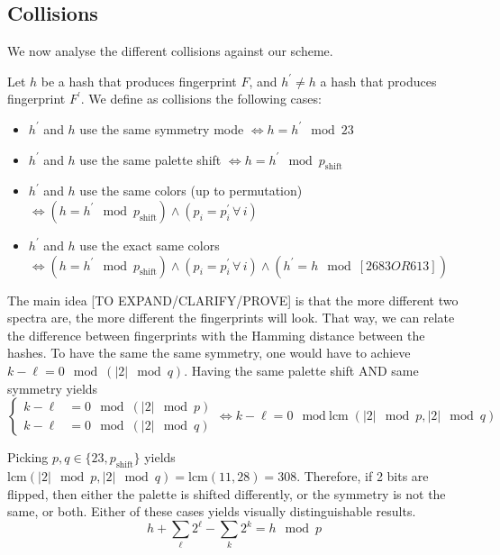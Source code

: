 \documentclass{article}
\begin{document}
\subsection{Collisions}
\newcommand{\foralls}{\hspace{2pt}\forall\hspace{2pt}}
We now analyse the different collisions against our scheme. 

Let $h$ be a hash that produces fingerprint $F$, and $h^\prime \neq h$ a hash that produces fingerprint $F^\prime$. We define as collisions the following cases:
\begin{itemize}
	\item $h^\prime$ and $h$ use the same symmetry mode $\iff h = h^\prime \mod 23$
	\item $h^\prime$ and $h$ use the same palette shift $\iff h = h^\prime \mod p_{\text{shift}}$
	\item $h^\prime$ and $h$ use the same colors (up to permutation) $\iff (h = h^\prime \mod p_{\text{shift}}) \wedge (p_i = p^\prime_i \foralls i)$
	\item $h^\prime$ and $h$ use the exact same colors $\iff (h = h^\prime \mod p_{\text{shift}}) \wedge (p_i = p^\prime_i \foralls i) \wedge (h^\prime = h \mod [2683 OR 613])$
\end{itemize}

The main idea [TO EXPAND/CLARIFY/PROVE] is that the more different two spectra are, the more different the fingerprints will look. That way, we can relate the difference between fingerprints with the Hamming distance between the hashes.
To have the same the same symmetry, one would have to achieve $k - \ell = 0\mod (|2| \mod q)$. Having the same palette shift AND same symmetry yields
$$\begin{cases}
k - \ell &= 0 \mod (|2| \mod p)\\
k - \ell &= 0 \mod (|2| \mod q)
\end{cases} \iff k - \ell = 0 \mod \text{lcm}(|2| \mod p, |2| \mod q)$$

Picking $p, q \in \{23, p_{\text{shift}}\}$ yields $\text{lcm}(|2| \mod p, |2| \mod q) = \text{lcm}(11, 28) = 308$. Therefore, if 2 bits are flipped, then either the palette is shifted differently, or the symmetry is not the same, or both. Either of these cases yields visually distinguishable results.
$$	h + \sum\limits_\ell 2^\ell - \sum\limits_k 2^k = h \mod p $$
\end{document}
